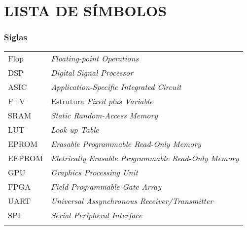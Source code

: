                       

\chapter*{LISTA DE SÍMBOLOS} %

\subsection*{Siglas}
\begin{tabular}{p{}p{}}
Flop & \textit{Floating-point Operations}\\
DSP & \textit{Digital Signal Processor}\\
ASIC & \textit{Application-Specific Integrated Circuit}\\
F+V & Estrutura \textit{Fixed plus Variable}\\
SRAM & \textit{Static Random-Access Memory}\\
LUT & \textit{Look-up Table}\\
EPROM & \textit{Erasable Programmable Read-Only Memory}\\
EEPROM & \textit{Eletrically Erasable Programmable Read-Only Memory}\\
GPU & \textit{Graphics Processing Unit}\\
FPGA & \textit{Field-Programmable Gate Array}\\
UART & \textit{Universal Assynchronous Receiver/Transmitter}\\
SPI & \textit{Serial Peripheral Interface}\\
& \textit{}\\
\end{tabular}

